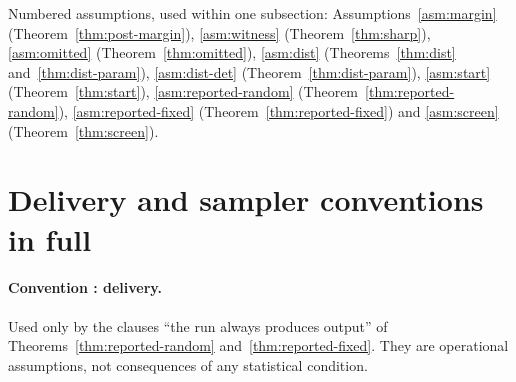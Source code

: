 \noindent Numbered assumptions, used within one subsection: Assumptions~\ref{asm:margin} (Theorem~\ref{thm:post-margin}),
\ref{asm:witness} (Theorem~\ref{thm:sharp}), \ref{asm:omitted} (Theorem~\ref{thm:omitted}), \ref{asm:dist}
(Theorems~\ref{thm:dist} and~\ref{thm:dist-param}), \ref{asm:dist-det} (Theorem~\ref{thm:dist-param}), \ref{asm:start}
(Theorem~\ref{thm:start}), \ref{asm:reported-random} (Theorem~\ref{thm:reported-random}), \ref{asm:reported-fixed}
(Theorem~\ref{thm:reported-fixed}) and \ref{asm:screen} (Theorem~\ref{thm:screen}).

\section{Delivery and sampler conventions in full}\label{app:conventions}

\paragraph{Convention : delivery.} Used only by the clauses ``the run always produces output'' of
Theorems~\ref{thm:reported-random} and~\ref{thm:reported-fixed}. They are operational assumptions, not consequences of any
statistical condition.
